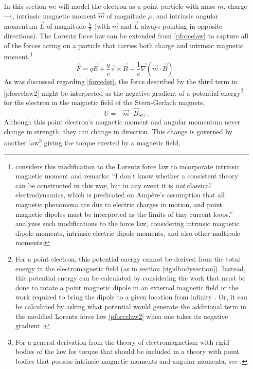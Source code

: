 \documentclass[12pt,secnumarabic,amsmath,amssymb,balancelastpage,nofootinbib]{article}
\begin{document}
In this section we will model the electron as a point particle with mass $m$, charge $-e$, intrinsic magnetic moment $\vec{m}$ of magnitude $\mu$, and intrinsic angular momentum $\vec{L}$ of magnitude $\frac{\hbar}{2}$ (with $\vec{m}$ and $\vec{L}$ always pointing in opposite directions).  The Lorentz force law can be extended from \eqref{pforcelaw} to capture all of the forces acting on a particle that carries both charge and intrinsic magnetic moment,\footnote{\citet[pg.\ 378]{griffiths} considers this modification to the Lorentz force law to incorporate intrinsic magnetic moment and remarks: ``I don't know whether a consistent theory can be constructed in this way, but in any event it is \emph{not} classical electrodynamics, which is predicated on Amp\`{e}re's assumption that all magnetic phenomena are due to electric charges in motion, and point magnetic dipoles must be interpreted as the limits of tiny current loops.''  \citet{barandes2019long, barandes2019short} analyzes such modifications to the force law, considering intrinsic magnetic dipole moments, intrinsic electric dipole moments, and also other multipole moments.\label{modifiedforcefootnote}}
\begin{equation}
\vec{F}= q  \vec{E} + \frac{q}{c} \vec{v} \times \vec{B} + \frac{1}{c}\vec{\nabla} \left(\vec{m}\cdot\vec{B} \right)
\ .
\label{pforcelaw2}
\end{equation}
As was discussed regarding \eqref{forceder}, the force described by the third term in \eqref{pforcelaw2} might be interpreted as the negative gradient of a potential energy\footnote{For a point electron, this potential energy cannot be derived from the total energy in the electromagnetic field (as in section \ref{rigidbodysection}).  Instead, this potential energy can be calculated by considering the work that must be done to rotate a point magnetic dipole in an external magnetic field \citep[problem 6.21]{griffiths} or the work required to bring the dipole to a given location from infinity \citep[pg.\ 227]{goodnelson1971}.  Or, it can be calculated by asking what potential would generate the additional term in the modified Lorentz force law \eqref{pforcelaw2} when one takes its negative gradient \citep[sec.\ 5.7]{jackson}.} for the electron in the magnetic field of the Stern-Gerlach magnets,
\begin{equation}
U=- \vec{m} \cdot \vec{B}_{SG}
\ .
\label{penergy}
\end{equation}
Although this point electron's magnetic moment and angular momentum never change in strength, they can change in direction.  This change is governed by another law\footnote{For a general derivation from the theory of electromagnetism with rigid bodies of the law for torque that should be included in a theory with point bodies that possess intrinsic magnetic moments and angular momenta, see \citet[sec.\ 5.7]{jackson}.} giving the torque exerted by a magnetic field,
\end{document}
